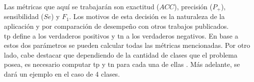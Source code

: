 \indent Las métricas que aquí se trabajarán son exactitud ($ACC$), precisión ($P_+$), sensibilidad ($Se$) y $F_1$.
Los motivos de esta decisión es la naturaleza de la aplicación y por comparación de desempeño con otros trabajos
publicados. \\
\indent \acrshort{tp} define a los verdaderos positivos y \acrshort{tn} a los verdaderos negativos. En base a estos
dos parámetros se pueden calcular todas las métricas mencionadas. Por otro lado, cabe destacar que dependiendo de la
cantidad de clases que el problema posea, es necesario computar \acrshort{tp} y \acrshort{tn} para cada una de ellas
. Más adelante, se dará un ejemplo en el caso de 4 clases.
